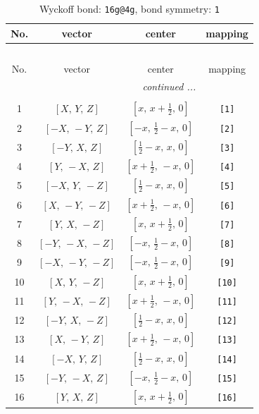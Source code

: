 \documentclass[fleqn,8pt]{jsarticle}
\begin{document}
\begin{longtable}{cccc}
\caption{Wyckoff bond: {\tt 16g@4g}, bond symmetry: {\tt 1}}
 \\
 \hline \hline
No. & vector & center & mapping \\ \hline \endfirsthead

\multicolumn{3}{l}{\tablename\ \thetable{}} \\
 \hline \hline
No. & vector & center & mapping \\ \hline \endhead

 \hline \hline
\multicolumn{3}{r}{\footnotesize\it continued ...} \\ \endfoot

 \hline \hline
\multicolumn{3}{r}{} \\ \endlastfoot

1 & $\left[ X,\, Y,\, Z \right]$ & $\left[ x,\, x + \frac{1}{2},\, 0 \right]$ & {\tt [1]} \\ \hline
2 & $\left[ - X,\, - Y,\, Z \right]$ & $\left[ - x,\, \frac{1}{2} - x,\, 0 \right]$ & {\tt [2]} \\ \hline
3 & $\left[ - Y,\, X,\, Z \right]$ & $\left[ \frac{1}{2} - x,\, x,\, 0 \right]$ & {\tt [3]} \\ \hline
4 & $\left[ Y,\, - X,\, Z \right]$ & $\left[ x + \frac{1}{2},\, - x,\, 0 \right]$ & {\tt [4]} \\ \hline
5 & $\left[ - X,\, Y,\, - Z \right]$ & $\left[ \frac{1}{2} - x,\, x,\, 0 \right]$ & {\tt [5]} \\ \hline
6 & $\left[ X,\, - Y,\, - Z \right]$ & $\left[ x + \frac{1}{2},\, - x,\, 0 \right]$ & {\tt [6]} \\ \hline
7 & $\left[ Y,\, X,\, - Z \right]$ & $\left[ x,\, x + \frac{1}{2},\, 0 \right]$ & {\tt [7]} \\ \hline
8 & $\left[ - Y,\, - X,\, - Z \right]$ & $\left[ - x,\, \frac{1}{2} - x,\, 0 \right]$ & {\tt [8]} \\ \hline
9 & $\left[ - X,\, - Y,\, - Z \right]$ & $\left[ - x,\, \frac{1}{2} - x,\, 0 \right]$ & {\tt [9]} \\ \hline
10 & $\left[ X,\, Y,\, - Z \right]$ & $\left[ x,\, x + \frac{1}{2},\, 0 \right]$ & {\tt [10]} \\ \hline
11 & $\left[ Y,\, - X,\, - Z \right]$ & $\left[ x + \frac{1}{2},\, - x,\, 0 \right]$ & {\tt [11]} \\ \hline
12 & $\left[ - Y,\, X,\, - Z \right]$ & $\left[ \frac{1}{2} - x,\, x,\, 0 \right]$ & {\tt [12]} \\ \hline
13 & $\left[ X,\, - Y,\, Z \right]$ & $\left[ x + \frac{1}{2},\, - x,\, 0 \right]$ & {\tt [13]} \\ \hline
14 & $\left[ - X,\, Y,\, Z \right]$ & $\left[ \frac{1}{2} - x,\, x,\, 0 \right]$ & {\tt [14]} \\ \hline
15 & $\left[ - Y,\, - X,\, Z \right]$ & $\left[ - x,\, \frac{1}{2} - x,\, 0 \right]$ & {\tt [15]} \\ \hline
16 & $\left[ Y,\, X,\, Z \right]$ & $\left[ x,\, x + \frac{1}{2},\, 0 \right]$ & {\tt [16]} \\
\end{longtable}
\end{document}
